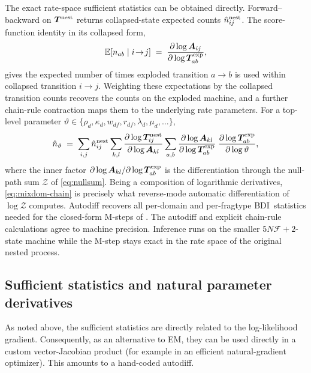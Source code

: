 \documentclass{article}
\newcommand{\BDI}{\textsc{BDI}}
\newcommand{\E}{\mathbb{E}}
\newcommand{\ins}{\lambda}
\newcommand{\del}{\mu}
\newcommand{\Zsum}{\mathcal{Z}}
\newcommand{\Aeff}{\bm{A}}
\begin{document}
The exact rate-space sufficient statistics can be obtained directly. Forward--backward on $\bm{T}^{\rm nest}$
returns collapsed-state expected counts $\hat n^{\rm nest}_{ij}$. The
score-function identity in its collapsed form,
\begin{equation}
\label{eq:mixdom-score}
\E[n_{ab}\mid i\!\to\! j]
 \;=\; \frac{\partial\log \Aeff_{ij}}{\partial\log \bm{T}^{\rm exp}_{ab}},
\end{equation}
gives the expected number of times exploded transition $a\to b$ is used
within collapsed transition $i\to j$.
Weighting these expectations by the collapsed transition counts recovers 
the counts on the exploded machine, and a further chain-rule contraction 
maps them to the underlying rate parameters.
For a top-level parameter
$\vartheta\in\{\rho_d,\kappa_d,w_{df},r_{df},\ins_d,\del_d,\dots\}$,
\begin{equation}
\label{eq:mixdom-chain}
\hat n_\vartheta
 \;=\; \sum_{i,j} \hat n^{\rm nest}_{ij}
   \sum_{k,l}\frac{\partial\log \bm{T}^{\rm nest}_{ij}}
                  {\partial\log \Aeff_{kl}}
   \sum_{a,b}\frac{\partial\log \Aeff_{kl}}
                  {\partial\log \bm{T}^{\rm exp}_{ab}}\;
            \frac{\partial\log \bm{T}^{\rm exp}_{ab}}
                  {\partial\log\vartheta},
\end{equation}
where the inner factor $\partial\log\Aeff_{kl}/\partial\log\bm{T}^{\rm
exp}_{ab}$ is the differentiation through the null-path sum $\Zsum$ of
\eqref{eq:nullsum}. Being a composition of logarithmic derivatives,
\eqref{eq:mixdom-chain} is precisely what reverse-mode automatic
differentiation of $\log\Zsum$ computes.
Autodiff recovers all per-domain and per-fragtype \BDI\ statistics needed
for the closed-form M-steps of . 
The autodiff and explicit chain-rule calculations agree to machine precision.
Inference runs on the smaller $5N \mathcal F {+}2$-state
machine while the M-step stays exact in the rate space of the original
nested process.

\subsection{Sufficient statistics and natural parameter derivatives}

As noted above, the sufficient statistics are directly related
to the log-likelihood gradient. Consequently, as an alternative to EM, they can be used directly in a custom vector-Jacobian product (for example in an efficient natural-gradient optimizer).
This amounts to a hand-coded autodiff.
\end{document}
